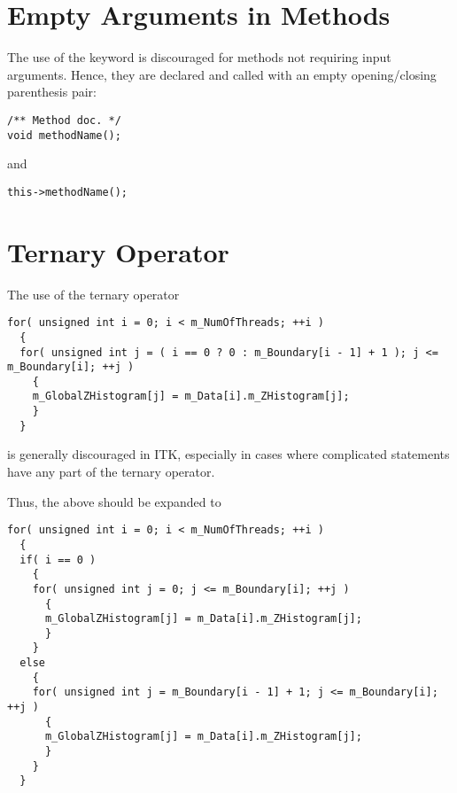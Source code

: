 \section{Empty Arguments in Methods}
\label{sec:EmptyArgumentInMethods}

The use of the  keyword is discouraged for methods not requiring
input arguments. Hence, they are declared and called with an empty
opening/closing parenthesis pair:

\small
\begin{verbatim}
/** Method doc. */
void methodName();
\end{verbatim}
\normalsize

and

\small
\begin{verbatim}
this->methodName();
\end{verbatim}
\normalsize


\section{Ternary Operator}
\label{sec:TernaryOperator}

The use of the ternary operator

\small
\begin{verbatim}
for( unsigned int i = 0; i < m_NumOfThreads; ++i )
  {
  for( unsigned int j = ( i == 0 ? 0 : m_Boundary[i - 1] + 1 ); j <= m_Boundary[i]; ++j )
    {
    m_GlobalZHistogram[j] = m_Data[i].m_ZHistogram[j];
    }
  }
\end{verbatim}
\normalsize

is generally discouraged in ITK, especially in cases where complicated
statements have any part of the ternary operator.

Thus, the above should be expanded to

\small
\begin{verbatim}
for( unsigned int i = 0; i < m_NumOfThreads; ++i )
  {
  if( i == 0 )
    {
    for( unsigned int j = 0; j <= m_Boundary[i]; ++j )
      {
      m_GlobalZHistogram[j] = m_Data[i].m_ZHistogram[j];
      }
    }
  else
    {
    for( unsigned int j = m_Boundary[i - 1] + 1; j <= m_Boundary[i]; ++j )
      {
      m_GlobalZHistogram[j] = m_Data[i].m_ZHistogram[j];
      }
    }
  }
\end{verbatim}
\normalsize

